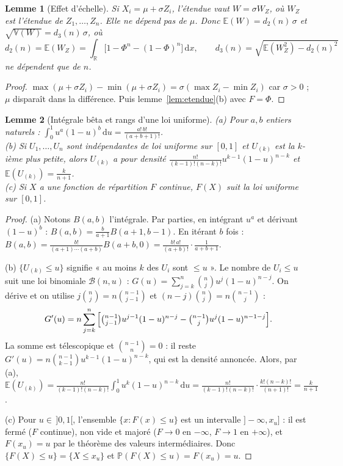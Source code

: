 \documentclass[11pt,a4paper]{article}
\theoremstyle{tq}
\newtheorem{lem}{Lemme}
\theoremstyle{remark}
\newcommand{\E}{\mathbb{E}}
\newcommand{\V}{\mathbb{V}}
\renewcommand{\P}{\mathbb{P}}
\newcommand{\R}{\mathbb{R}}
\newcommand{\dd}{\,\mathrm{d}}
\begin{document}
\begin{lem}[Effet d'échelle]\label{lem:echelle}
Si $X_i=\mu+\sigma Z_i$, l'étendue vaut $W=\sigma W_Z$, où $W_Z$ est l'étendue de $Z_1,\dots,Z_n$. Elle ne dépend pas de $\mu$. Donc $\E(W)=d_2(n)\,\sigma$ et $\sqrt{\V(W)}=d_3(n)\,\sigma$, où
\[
d_2(n)=\E(W_Z)=\int_{\R}\big[1-\Phi^n-(1-\Phi)^n\big]\dd x,\qquad d_3(n)=\sqrt{\E(W_Z^2)-d_2(n)^2}
\]
ne dépendent que de $n$.
\end{lem}
\begin{proof}
$\max(\mu+\sigma Z_i)-\min(\mu+\sigma Z_i)=\sigma(\max Z_i-\min Z_i)$ car $\sigma>0$ ; $\mu$ disparaît dans la différence. Puis lemme~\ref{lem:etendue}(b) avec $F=\Phi$.
\end{proof}

\begin{lem}[Intégrale bêta et rangs d'une loi uniforme]\label{lem:beta}
(a) Pour $a,b$ entiers naturels : $\displaystyle\int_0^1u^a(1-u)^b\dd u=\frac{a!\,b!}{(a+b+1)!}$.\\
(b) Si $U_1,\dots,U_n$ sont indépendantes de loi uniforme sur $[0,1]$ et $U_{(k)}$ est la $k$-ième plus petite, alors $U_{(k)}$ a pour densité $\frac{n!}{(k-1)!(n-k)!}u^{k-1}(1-u)^{n-k}$ et $\E(U_{(k)})=\frac{k}{n+1}$.\\
(c) Si $X$ a une fonction de répartition $F$ continue, $F(X)$ suit la loi uniforme sur $[0,1]$.
\end{lem}
\begin{proof}
(a) Notons $B(a,b)$ l'intégrale. Par parties, en intégrant $u^a$ et dérivant $(1-u)^b$ : $B(a,b)=\frac{b}{a+1}B(a+1,b-1)$. En itérant $b$ fois : $B(a,b)=\frac{b!}{(a+1)\cdots(a+b)}B(a+b,0)=\frac{b!\,a!}{(a+b)!}\cdot\frac{1}{a+b+1}$.

(b) $\{U_{(k)}\le u\}$ signifie « au moins $k$ des $U_i$ sont $\le u$ ». Le nombre de $U_i\le u$ suit une loi binomiale $\mathcal B(n,u)$ :
$G(u)=\sum_{j=k}^n\binom nj u^j(1-u)^{n-j}$. On dérive et on utilise $j\binom nj=n\binom{n-1}{j-1}$ et $(n-j)\binom nj=n\binom{n-1}{j}$ :
\[
G'(u)=n\sum_{j=k}^n\Big[\tbinom{n-1}{j-1}u^{j-1}(1-u)^{n-j}-\tbinom{n-1}{j}u^{j}(1-u)^{n-1-j}\Big].
\]
La somme est télescopique et $\binom{n-1}{n}=0$ : il reste $G'(u)=n\binom{n-1}{k-1}u^{k-1}(1-u)^{n-k}$, qui est la densité annoncée. Alors, par (a),
$\E(U_{(k)})=\frac{n!}{(k-1)!(n-k)!}\int_0^1u^k(1-u)^{n-k}\dd u=\frac{n!}{(k-1)!(n-k)!}\cdot\frac{k!(n-k)!}{(n+1)!}=\frac{k}{n+1}$.

(c) Pour $u\in\,]0,1[$, l'ensemble $\{x : F(x)\le u\}$ est un intervalle $]-\infty,x_u]$ : il est fermé ($F$ continue), non vide et majoré ($F\to0$ en $-\infty$, $F\to1$ en $+\infty$), et $F(x_u)=u$ par le théorème des valeurs intermédiaires. Donc $\{F(X)\le u\}=\{X\le x_u\}$ et $\P(F(X)\le u)=F(x_u)=u$.
\end{proof}
\end{document}
